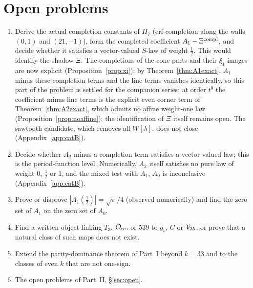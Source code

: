 \section{Open problems}\label{sec:gopen}
\begin{enumerate}[label=\arabic*.,leftmargin=2em]
\item\label{op:xi} Derive the actual completion constants of $H_7$ (erf-completion along the walls $(0,1)$ and $(21,-1)$), form the completed coefficient $A_1-\Xi^{\rm compl}$, and
decide whether it satisfies a vector-valued $S$-law of weight $\frac12$. This would identify the shadow $\Xi$. The completions of the cone parts and their $\xi_1$-images are now explicit (Proposition~\ref{prop:xi}); by Theorem~\ref{thm:A1exact}, $A_1$ minus these completion terms and the line terms vanishes identically, so this part of the problem is settled for the companion series; at order $t^0$ the coefficient minus line terms is the explicit even corner term of Theorem~\ref{thm:A2exact}, which admits no affine weight-one law (Proposition~\ref{prop:noaffine}); the identification of $\Xi$ itself remains open. The sawtooth candidate, which removes all $W[\lambda]$, does not close (Appendix~\ref{app:catB}).
\item Decide whether $A_2$ minus a completion term satisfies a vector-valued law; this is the period-function level. Numerically, $A_2$ itself satisfies no pure law of weight $0$, $\frac12$ or $1$, and the mixed test with $A_1$, $A_0$ is inconclusive (Appendix~\ref{app:catB}).
\item Prove or disprove $|A_1(\frac12)|=\sqrt\pi/4$ (observed numerically) and find the zero set of $A_1$ on the zero set of $A_0$.
\item Find a written object linking $T_3$, $\mathcal O_{\rm res}$ or $539$ to $g_s$, $C$ or $\mathcal V_{35}$, or prove that a natural class of such maps does not exist.
\item Extend the parity-dominance theorem of Part~I beyond $k=33$ and to the classes of even $k$ that are not one-sign.
\item The open problems of Part~II, \S\ref{sec:open}.
\end{enumerate}
